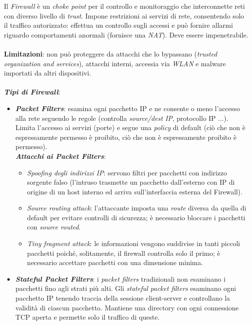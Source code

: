 \documentclass[11pt, a4paper, twoside, italian]{report}
\theoremstyle{plain}
\begin{document}
\noindent
Il \textit{Firewall} è un \textit{choke point} per il controllo e monitoraggio che interconnette reti con diverso livello di \textit{trust}. Impone restrizioni ai servizi di rete, consentendo solo il traffico autorizzato: effettua un controllo sugli accessi e può fornire allarmi riguardo comportamenti anormali (fornisce una \textit{NAT}). Deve essere impenetrabile.\\
\\
\textbf{Limitazioni}: non può proteggere da attacchi che lo bypassano (\textit{trusted organization and services}), attacchi interni, accessia via \textit{WLAN} e malware importati da altri dispositivi.\\
\\
\textit{\textbf{Tipi di Firewall}}:
\begin{itemize}
	\item \textit{\textbf{Packet Filters}}: esamina ogni pacchetto IP e ne consente o meno l'accesso alla rete seguendo le regole (controlla \textit{source/dest IP}, protocollo IP $\dots$). Limita l'accesso ai servizi (porte) e segue una \textit{policy} di default (ciò che non è espressamente permesso è proibito, ciò che non è espressamente proibito è permesso).\\
	\textit{\textbf{Attacchi ai Packet Filters}}:
	\begin{itemize}
		\item \textit{Spoofing degli indirizzi IP}: servono filtri per pacchetti con indirizzo sorgente falso (l'intruso trasmette un pacchetto dall'esterno con IP di origine di un host interno ed arriva sull'interfaccia esterna del Firewall).
		\item \textit{Source routing attack}: l'attaccante imposta una \textit{route} diversa da quella di default per evitare controlli di sicurezza; è necessario bloccare i pacchetti con \textit{source routed}.
		\item \textit{Tiny fragment attack}: le informazioni vengono suddivise in tanti piccoli pacchetti poiché, solitamente, il firewall controlla solo il primo; è necessario accettare pacchetti con una dimensione minima.
	\end{itemize}
	\item \textit{\textbf{Stateful Packet Filters}}: i \textit{packet filters} tradizionali non esaminano i pacchetti fino agli strati più alti. Gli \textit{stateful packet filters} esaminano ogni pacchetto IP tenendo traccia della sessione client-server e controllano la validità di ciascun pacchetto. Mantiene una directory con ogni connessione TCP aperta e permette solo il traffico di queste.

\end{itemize}
\end{document}
